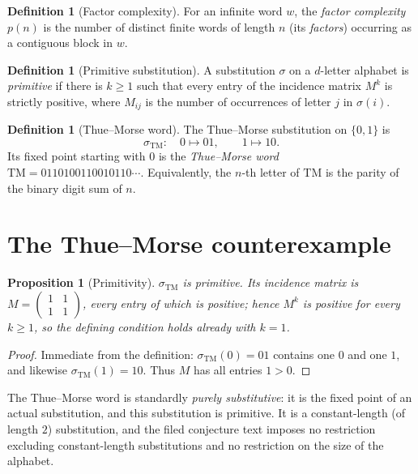 \documentclass[11pt]{article}
\newtheorem{proposition}[theorem]{Proposition}
\theoremstyle{definition}
\newtheorem{definition}[theorem]{Definition}
\theoremstyle{remark}
\newcommand{\TM}{\mathrm{TM}}
\begin{document}
\begin{definition}[Factor complexity]
For an infinite word $w$, the \emph{factor complexity} $p(n)$ is the number of
distinct finite words of length $n$ (its \emph{factors}) occurring as a
contiguous block in $w$.
\end{definition}

\begin{definition}[Primitive substitution]
A substitution $\sigma$ on a $d$-letter alphabet is \emph{primitive} if there
is $k \ge 1$ such that every entry of the incidence matrix $M^k$ is strictly
positive, where $M_{ij}$ is the number of occurrences of letter $j$ in
$\sigma(i)$.
\end{definition}

\begin{definition}[Thue--Morse word]
The Thue--Morse substitution on $\{0,1\}$ is
\[
\sigma_{\TM}\colon\quad 0 \mapsto 01,\qquad 1 \mapsto 10 .
\]
Its fixed point starting with $0$ is the \emph{Thue--Morse word}
$\TM = 0110100110010110\cdots$. Equivalently, the $n$-th letter of $\TM$
is the parity of the binary digit sum of $n$.
\end{definition}

\section{The Thue--Morse counterexample}

\begin{proposition}[Primitivity]
$\sigma_{\TM}$ is primitive. Its incidence matrix is
$M = \begin{pmatrix} 1 & 1 \\ 1 & 1 \end{pmatrix}$, every entry of which is
positive; hence $M^k$ is positive for every $k \ge 1$, so the defining
condition holds already with $k=1$.
\end{proposition}

\begin{proof}
Immediate from the definition: $\sigma_{\TM}(0) = 01$ contains one $0$ and one
$1$, and likewise $\sigma_{\TM}(1) = 10$. Thus $M$ has all entries $1>0$.
\end{proof}

The Thue--Morse word is standardly \emph{purely substitutive}: it is the fixed
point of an actual substitution, and this substitution is primitive. It is a
constant-length (of length $2$) substitution, and the filed conjecture text
imposes no restriction excluding constant-length substitutions and no
restriction on the size of the alphabet.
\end{document}
